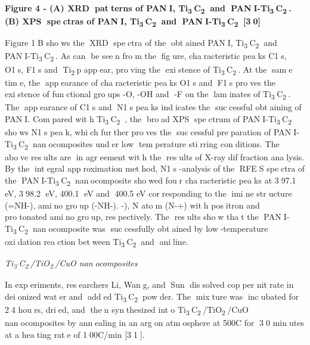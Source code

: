 {{\bfseries Figure 4 - (A) XRD patterns of PANI,
Ti\textsubscript{3}C\textsubscript{2} and
PANI-Ti\textsubscript{3}C\textsubscript{2}. (B) XPS spectras of
PANI, Ti\textsubscript{3}C\textsubscript{2} and
PANI-Ti\textsubscript{3}C\textsubscript{2} {[}30{]}}

Figure 1B shows the XRD spectra of the obtained PANI,
Ti\textsubscript{3}C\textsubscript{2} and
PANI-Ti\textsubscript{3}C\textsubscript{2}. As can be seen from
the figure, characteristic peaks C1s, O1s, F1s and
Ti\textsubscript{2}p appear, proving the existence of
Ti\textsubscript{3}C\textsubscript{2}. At the same time, the
appearance of characteristic peaks O1s and F1s proves the
existence of functional groups -O, -OH and -F on the laminates of
Ti\textsubscript{3}C\textsubscript{2}. The appearance of C1s and
N1s peaks indicates the successful obtaining of PANI. Compared
with Ti\textsubscript{3}C\textsubscript{2} , the broad XPS
spectrum of PANI-Ti\textsubscript{3}C\textsubscript{2} shows N1s
peak, which further proves the successful preparation of
PANI-Ti\textsubscript{3}C\textsubscript{2} nanocomposites under
low temperature stirring conditions. The above results are in
agreement with the results of X-ray diffraction analysis. By the
integral approximation method, N1s -analysis of the RFES spectra
of the PANI-Ti\textsubscript{3}C\textsubscript{2}
nan\textsubscript{}ocomposite showed four characteristic peaks at
397.1 eV, 398.2 eV, 400.1 eV and 400.5 eV corresponding to the
imine structure (=NH-), amino group (-NH-). -), N atom (N-+) with
positron and protonated amino group, respectively. The results
show that the PANI-Ti\textsubscript{3}C\textsubscript{2}
nanocomposite was successfully obtained by low-temperature
oxidation reaction between Ti\textsubscript{3}C\textsubscript{2}
and aniline.

\emph{Ti\textsubscript{3}C\textsubscript{2}/TiO\textsubscript{2}/CuO
nanocomposites}

In experiments, researchers Li, Wang, and Sun dissolved copper
nitrate in deionized water and added
Ti\textsubscript{3}C\textsubscript{2} powder. The mixture was
incubated for 24 hours, dried, and then synthesized into
Ti\textsubscript{3}C\textsubscript{2}/TiO\textsubscript{2}/CuO
nanocomposites by annealing in an argon atmosphere at 500C for 30
minutes at a heating rate of 100C/min {[}31{]}. \hl{}

}
